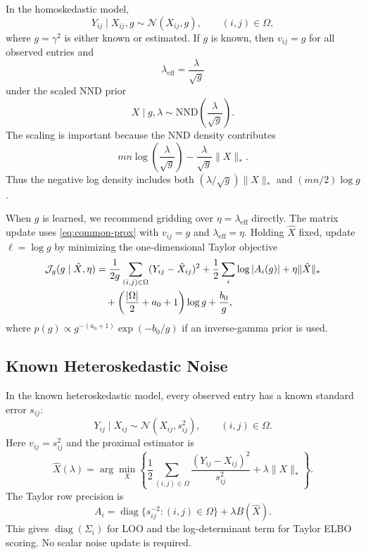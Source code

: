\documentclass[11pt]{article}
\begin{document}
In the homoskedastic model,
\begin{equation}
    Y_{ij}\mid X_{ij},g
    \sim
    \mathcal{N}(X_{ij},g),
    \qquad (i,j)\in\Omega,
\end{equation}
where $g=\gamma^2$ is either known or estimated.  If $g$ is known, then
$v_{ij}=g$ for all observed entries and
\begin{equation}
    \lambda_{\mathrm{eff}}=\frac{\lambda}{\sqrt{g}}
\end{equation}
under the scaled NND prior
\begin{equation}
    X\mid g,\lambda
    \sim
    \mathrm{NND}\!\left(\frac{\lambda}{\sqrt{g}}\right).
\end{equation}
The scaling is important because the NND density contributes
\begin{equation}
    mn\log\!\left(\frac{\lambda}{\sqrt{g}}\right)
    -
    \frac{\lambda}{\sqrt{g}}\|X\|_*.
\end{equation}
Thus the negative log density includes both
$(\lambda/\sqrt{g})\|X\|_*$ and $(mn/2)\log g$.

When $g$ is learned, we recommend gridding over
$\eta=\lambda_{\mathrm{eff}}$ directly.  The matrix update uses
\eqref{eq:common-prox} with $v_{ij}=g$ and
$\lambda_{\mathrm{eff}}=\eta$.  Holding $\hat X$ fixed, update
$\ell=\log g$ by minimizing the one-dimensional Taylor objective
\begin{align}
    \mathcal{J}_{g}(g\mid \hat X,\eta)
    &=
    \frac{1}{2g}
    \sum_{(i,j)\in\Omega}(Y_{ij}-\hat X_{ij})^2
    +
    \frac{1}{2}\sum_i \log |A_i(g)|
    +
    \eta\|\hat X\|_* \notag\\
    &\quad
    +
    \left(
        \frac{|\Omega|}{2}
        +
        a_0+1
    \right)\log g
    +
    \frac{b_0}{g},
\end{align}
where $p(g)\propto g^{-(a_0+1)}\exp(-b_0/g)$ if an inverse-gamma prior is used.

\subsection{Known Heteroskedastic Noise}

In the known heteroskedastic model, every observed entry has a known standard
error $s_{ij}$:
\begin{equation}
    Y_{ij}\mid X_{ij}
    \sim
    \mathcal{N}(X_{ij},s_{ij}^2),
    \qquad (i,j)\in\Omega.
\end{equation}
Here $v_{ij}=s_{ij}^2$ and the proximal estimator is
\begin{equation}
    \hat X(\lambda)
    =
    \arg\min_X
    \left\{
        \frac{1}{2}
        \sum_{(i,j)\in\Omega}
        \frac{(Y_{ij}-X_{ij})^2}{s_{ij}^2}
        +
        \lambda\|X\|_*
    \right\}.
\end{equation}
The Taylor row precision is
\begin{equation}
    A_i
    =
    \operatorname{diag}\{s_{ij}^{-2}:(i,j)\in\Omega\}
    +
    \lambda B(\hat X).
\end{equation}
This gives $\operatorname{diag}(\Sigma_i)$ for LOO and the log-determinant term
for Taylor ELBO scoring.  No scalar noise update is required.
\end{document}

